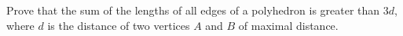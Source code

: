 Prove that the sum of the lengths of all edges of a polyhedron is greater than $3d$, where $d$ is the distance of two vertices $A$ and $B$ of maximal distance.
